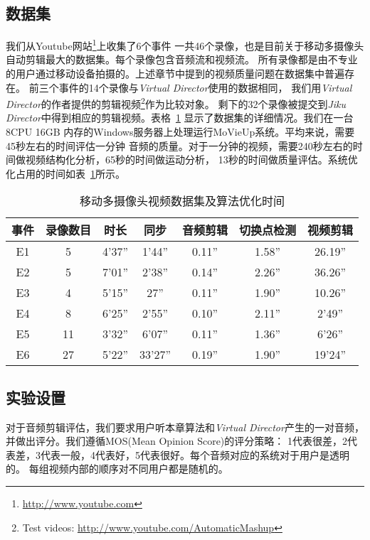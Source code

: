 \subsection{数据集}我们从Youtube网站\footnote{\url{http://www.youtube.com}}上收集了6个事件
一共46个录像，也是目前关于移动多摄像头自动剪辑最大的数据集。每个录像包含音频流和视频流。
所有录像都是由不专业的用户通过移动设备拍摄的。上述章节中提到的视频质量问题在数据集中普遍存在。
前三个事件的14个录像与\emph{Virtual Director}使用的数据相同，
我们用\emph{Virtual Director}的作者提供的剪辑视频\footnote{Test videos:
\url{http://www.youtube.com/AutomaticMashup}}作为比较对象。
剩下的32个录像被提交到\emph{Jiku Director}中得到相应的剪辑视频。表格~\ref{tab:mashup-dataset-opt-time}
显示了数据集的详细情况。我们在一台8CPU 16GB
内存的Windows服务器上处理运行MoVieUp系统。平均来说，需要45秒左右的时间评估一分钟
音频的质量。对于一分钟的视频，需要240秒左右的时间做视频结构化分析，65秒的时间做运动分析，
13秒的时间做质量评估。系统优化占用的时间如表~\ref{tab:mashup-dataset-opt-time}所示。

\begin{table}[htbp]
	\centering
	\caption{移动多摄像头视频数据集及算法优化时间}
	\label{tab:mashup-dataset-opt-time}
	\begin{tabular}{|c|c|c|c|c|c|c|}
		\hline
        事件 & 录像数目 & 时长 & 同步 & 音频剪辑 & 切换点检测 & 视频剪辑 \\
		\hline
		E1 & 5 & 4'37'' &1'44''  & 0.11'' & 1.58'' & 26.19''  \\ \hline
		E2 & 5 & 7'01'' &2'38''  &0.14'' & 2.26'' & 36.26''  \\ \hline
		E3 & 4 & 5'15'' &27''  &0.11'' & 1.90'' & 10.26''  \\ \hline
		E4 & 8 & 6'25'' &2'55''  & 0.10'' & 2.11'' & 2'49'' \\ \hline
		E5 & 11 & 3'32''&6'07''  & 0.11'' & 1.36'' & 6'26'' \\ \hline
		E6 & 27 & 5'22''&33'27''  & 0.19'' & 1.90'' & 19'24'' \\ \hline
	\end{tabular}
\end{table}

\subsection{实验设置}
对于音频剪辑评估，我们要求用户听本章算法和\emph{Virtual Director}产生的一对音频，
并做出评分。我们遵循MOS(Mean Opinion Score)的评分策略：
1代表很差，2代表差，3代表一般，4代表好，5代表很好。每个音频对应的系统对于用户是透明的。
每组视频内部的顺序对不同用户都是随机的。


